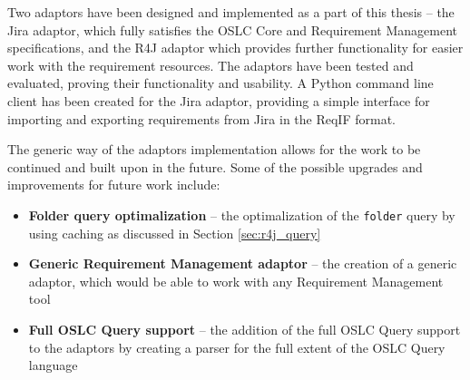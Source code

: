 Two adaptors have been designed and implemented as a part of this thesis -- the Jira adaptor, which fully satisfies the OSLC Core and Requirement Management specifications, and the R4J adaptor which provides further functionality for easier work with the requirement resources. The adaptors have been tested and evaluated, proving their functionality and usability. A Python command line client has been created for the Jira adaptor, providing a simple interface for importing and exporting requirements from Jira in the ReqIF format.

The generic way of the adaptors implementation allows for the work to be continued and built upon in the future. Some of the possible upgrades and improvements for future work include:

\begin{itemize}
  \item \textbf{Folder query optimalization} -- the optimalization of the \texttt{folder} query by using caching as discussed in Section \ref{sec:r4j_query}
  \item \textbf{Generic Requirement Management adaptor} -- the creation of a generic adaptor, which would be able to work with any Requirement Management tool
  \item \textbf{Full OSLC Query support} -- the addition of the full OSLC Query support to the adaptors by creating a parser for the full extent of the OSLC Query language
\end{itemize}


% 